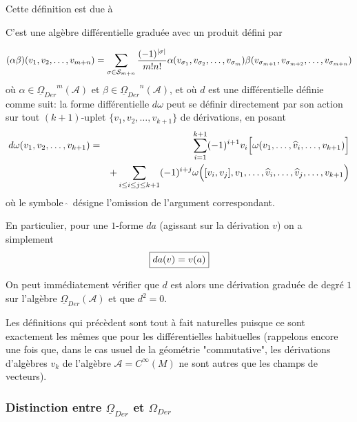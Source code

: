 Cette d\'efinition est due \`a \cite{MDV-cras}

C'est une alg\`ebre diff\'erentielle gradu\'ee avec un produit d\'efini par

$$
(\alpha \beta)(v_1, v_2, \dots, v_{m + n}) = \sum_{\sigma \in 
{\mathcal S}_{m+n}}{ (-1)^{\vert \sigma \vert} \over m! n!} 
\alpha(v_{\sigma_{1}}, v_{\sigma_{2}}, \dots, v_{\sigma_{m}})
\beta(v_{\sigma_{m+1}}, v_{\sigma_{m+2}}, \dots, v_{\sigma_{m+n}})
$$
o\`u $\alpha \in {\underline{\Omega}_{Der}}^{m}({\mathcal A})$ et $\beta \in 
{\underline{\Omega}_{Der}}^{n}({\mathcal A})$,
et o\`u $d$ est une diff\'erentielle d\'efinie comme suit:  
la forme diff\'erentielle 
$d \omega$ peut se d\'efinir directement par son action sur tout
$(k+1)$-uplet
$\{ v_1, v_2, \dots, v_{k + 1} \}$ de d\'erivations, en posant 
\begin{eqnarray*}
 d \omega (v_1, v_2, \dots, v_{k + 1}) 
& = & \sum_{i = 1}^{k + 1} (- 1)^{i + 1} v_i
\Bigl[
\omega (v_1, \dots, \widehat v_i, \dots, v_{k + 1})
\Bigr]                                               \nonumber \\
& & + 
\sum_{i \le i \le j \le k+1 } (- 1)^{i + j} \omega
\Bigl(
[v_i, v_j], v_1, \dots, 
\widehat v_i, \dots, 
\widehat v_j, \dots, v_{k + 1}
\Bigr) 
\end{eqnarray*}
o\`u le symbole $\, \widehat{} \,$ d\'esigne l'omission de l'argument correspondant.
 
 En particulier, pour une $1$-forme $da$ (agissant sur la d\'erivation 
 $v$) on a simplement
 $$
 \mbox{\fbox{$ 
 da(v)=v(a)
 $}}
 $$
 
 On peut imm\'ediatement v\'erifier que $d$ est alors une d\'erivation 
 gradu\'ee de degr\'e $1$ sur l'alg\`ebre ${\underline{\Omega}_{Der}}({\mathcal A})$ et 
 que $d^{2}=0.$

Les d\'efinitions qui pr\'ec\`edent sont tout \`a fait naturelles puisque ce 
sont exactement les m\^emes que pour les diff\'erentielles habituelles 
(rappelons encore une fois que, dans le cas usuel de la g\'eom\'etrie 
"commutative", les d\'erivations d'alg\`ebres $v_{k}$ de l'alg\`ebre 
${\mathcal A} = C^\infty(M)$ ne sont autres que 
les champs de vecteurs).

\subsubsection{Distinction entre $\underline{\Omega}_{Der}$ et 
$\Omega_{Der}$}

